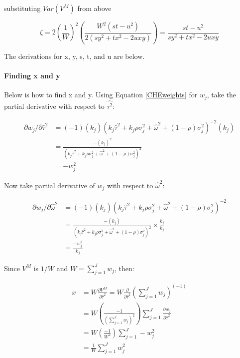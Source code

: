 substituting $Var(V^M)$ from above

\begin{equation}
     \zeta = 2\left(\frac{1}{W}\right)^2\left(\frac{W^2(st-u^2)}{2(sy^2+tx^2-2uxy)}\right) =  \frac{st - u^2}{sy^2 + tx^2 - 2uxy}
     \nonumber
\end{equation}


The derivations for x, y, s, t, and u are below. 

\paragraph{Finding x and y}

Below is how to find x and y. Using Equation \ref{CHEweights} for $w_j$, take the partial derivative with respect to $\hat{\tau^2}$:

\begin{equation}
    \begin{split}
    \partial w_j / \partial \hat{\tau}^2 & = (-1) (k_j) (k_j\hat{\tau}^2 +k_j \rho \sigma^2_j + \hat{\omega}^2 + (1- \rho) \sigma^2_j)^{-2}(k_j) \\
    & = \frac{-(k_j)^2}{(k_j\hat{\tau}^2 +k_j \rho \sigma^2_j + \hat{\omega}^2 + (1- \rho) \sigma^2_j)^2} \\
    & = - w_j^2
    \end{split}
    \nonumber
\end{equation}

Now take partial derivative of $w_j$ with respect to $\hat{\omega}^2$:

\begin{equation}
    \begin{split}
    \partial w_j / \partial \hat{\omega}^2 & = (-1) (k_j) (k_j\hat{\tau}^2 +k_j \rho \sigma^2_j + \hat{\omega}^2 + (1- \rho) \sigma^2_j)^{-2} \\
    & = \frac{-(k_j)}{(k_j\hat{\tau}^2 +k_j \rho \sigma^2_j + \hat{\omega}^2 + (1- \rho) \sigma^2_j)^2} \times \frac{k_j}{k_j} \\
    & = \frac{- w_j^2}{k_j}
    \end{split}
    \nonumber
\end{equation}

Since $V^M$ is $1/W$ and $W= \sum_{j=1}^Jw_j$, then:

\begin{equation}
    \begin{split}
        x & = W \frac{\partial V^M}{\partial \hat{\tau}^2} = W \frac{\partial}{\partial \hat{\tau}^2} \left( \sum_{j=1}^Jw_j\right)^{(-1)} \\
         & = W \left( \frac{-1}{ (\sum_{j=1}^J w_j)^2 } \right) \sum_{j=1}^J \frac{\partial w_j}{\partial \hat{\tau}^2} \\
         & = W \left( \frac{-1}{ W^2 } \right) \sum_{j=1}^J - w_j^2 \\
         & = \frac{1}{W} \sum_{j=1}^J w_j^2
    \end{split}
    \nonumber
\end{equation}

